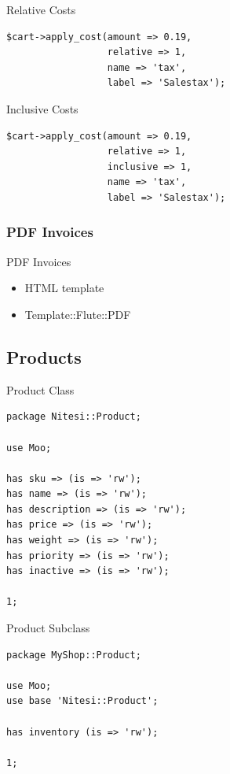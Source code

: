\begin{frame}[fragile]{Relative Costs}
\begin{lstlisting}
$cart->apply_cost(amount => 0.19, 
                  relative => 1, 
                  name => 'tax', 
                  label => 'Salestax');
\end{lstlisting}
\end{frame}

\begin{frame}[fragile]{Inclusive Costs}
\begin{lstlisting}
$cart->apply_cost(amount => 0.19, 
                  relative => 1, 
                  inclusive => 1, 
                  name => 'tax', 
                  label => 'Salestax');
\end{lstlisting}
\end{frame}

\subsubsection{PDF Invoices}
\begin{frame}{PDF Invoices}
\begin{itemize}
\item HTML template
\item Template::Flute::PDF
\end{itemize}
\end{frame}

\subsection{Products}
\begin{frame}[fragile]{Product Class}
\begin{lstlisting}
package Nitesi::Product;

use Moo;

has sku => (is => 'rw');
has name => (is => 'rw');
has description => (is => 'rw'); 
has price => (is => 'rw');
has weight => (is => 'rw');
has priority => (is => 'rw');
has inactive => (is => 'rw');

1;
\end{lstlisting}
\end{frame}

\begin{frame}[fragile]{Product Subclass}
\begin{lstlisting}
package MyShop::Product;

use Moo;
use base 'Nitesi::Product';

has inventory (is => 'rw');

1;
\end{lstlisting}
\end{frame}

